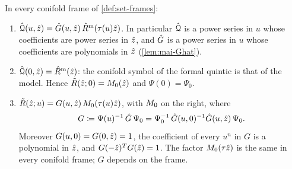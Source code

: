 \begin{cor}[the natural form after $\Dn=1$]
\label{cor:mai-natfact}
In every conifold frame of \cref{def:set-frames}:
\begin{enumerate}
\item[(a)] $\hat{\mathcal{Q}}(u,\hat{z})=\hat{G}(u,\hat{z})\,\hat{R}^{\mathrm m}(\tau(u)\hat{z})$. In particular $\hat{\mathcal{Q}}$ is a power series in $u$ whose coefficients are power series in $\hat{z}$, and $\hat{G}$ is a power series in $u$ whose coefficients are polynomials in $\hat{z}$ (\cref{lem:mai-Ghat}).
\item[(b)] $\hat{\mathcal{Q}}(0,\hat{z})=\hat{R}^{\mathrm m}(\hat{z})$: the conifold symbol of the formal quintic is that of the model. Hence $\tilde R(\hat{z};0)=M_{0}(\hat{z})$ and $\Psi(0)=\Psi_0$.
\item[(c)] $\tilde R(\hat{z};u)=G(u,\hat{z})\,M_{0}(\tau(u)\hat{z})$, with $M_{0}$ on the right, where
\[
G\coloneqq\Psi(u)^{-1}\,\hat{G}\,\Psi_0=\Psi_0^{-1}\,\hat{G}(u,0)^{-1}\hat{G}(u,\hat{z})\,\Psi_0 .
\]
Moreover $G(u,0)=G(0,\hat{z})=1$, the coefficient of every $u^n$ in $G$ is a polynomial in $\hat{z}$, and $G(-\hat{z})^TG(\hat{z})=1$. The factor $M_{0}(\tau\hat{z})$ is the same in every conifold frame; $G$ depends on the frame.
\end{enumerate}
\end{cor}


